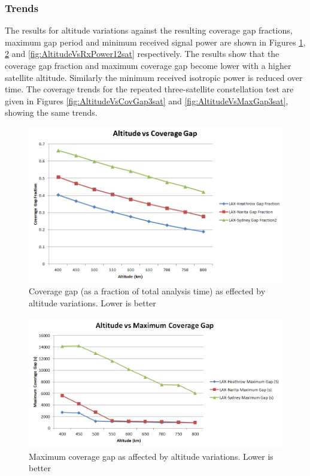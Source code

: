 \subsubsection{Trends}
The results for altitude variations against the resulting coverage gap fractions, maximum gap period and minimum received signal power are shown in Figures \ref{fig:AltitudeVsCovGap12sat}, \ref{fig:AltitudeVsMaxGap12sat} and \ref{fig:AltitudeVsRxPower12sat} respectively. The results show that the coverage gap fraction and maximum coverage gap become lower with a higher satellite altitude. Similarly the minimum received isotropic power is reduced over time.  The coverage trends for the repeated three-satellite constellation test are given in Figures \ref{fig:AltitudeVsCovGap3sat} and \ref{fig:AltitudeVsMaxGap3sat}, showing the same trends.
\begin{figure}[htbp]
	\centering
	\includegraphics[scale = 0.6]{Pictures/AltitudeVsCovGap12sat.png}
	
	\caption{Coverage gap (as a fraction of total analysis time) as effected by altitude variations. Lower is better}
	\label{fig:AltitudeVsCovGap12sat}
\end{figure} 


\begin{figure}[htbp]
	\centering
	\includegraphics[scale = 0.6]{Pictures/AltitudeVsMaxGap12sat.png}
	
	\caption{Maximum coverage gap as affected by altitude variations. Lower is better}
	\label{fig:AltitudeVsMaxGap12sat}
\end{figure} 

